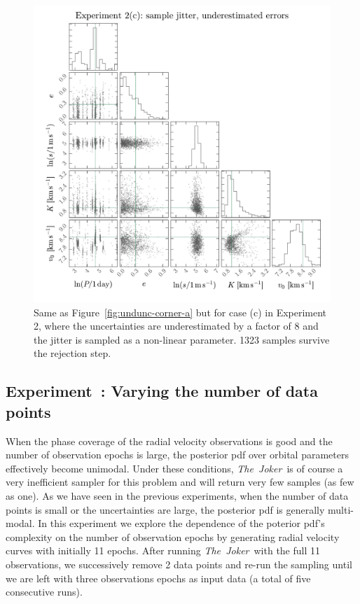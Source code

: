\documentclass[manuscript, letterpaper]{aastex6}
\newcommand{\project}[1]{\textsl{#1}}
\newcommand{\samplername}{\project{The~Joker}}
\newcommand{\figname}{Figure}
\newcounter{expcounter}
\begin{document}
\begin{figure}[p]
\begin{center}
\includegraphics[width=\textwidth]{figures/undunc-corner-c.pdf}
\end{center}
\caption{%
Same as \figname~\ref{fig:undunc-corner-a} but for case (c) in Experiment 2, where the
uncertainties are underestimated by a factor of 8 and the jitter is sampled as
a non-linear parameter.
1323 samples survive the rejection step.
\label{fig:undunc-corner-c}}
\end{figure}

\subsection{Experiment~: Varying the number of data points}
\label{sec:numpts}

When the phase coverage of the radial velocity observations is good and the
number of observation epochs is large, the posterior pdf over orbital parameters effectively
become unimodal.
Under these conditions, \samplername\ is of course a very inefficient sampler for this
problem and will return very few samples (as few as one).
As we have seen in the previous experiments, when the number of data points is
small or the uncertainties are large, the posterior pdf is generally
multi-modal.
In this experiment we explore the dependence of the poterior pdf's complexity on the number
of observation epochs by generating radial velocity curves with initially 11 epochs.
After running \samplername\ with the full 11 observations, we successively
remove 2 data points and re-run the sampling until we are left with three
observations epochs as input data (a total of five consecutive runs).
\end{document}
